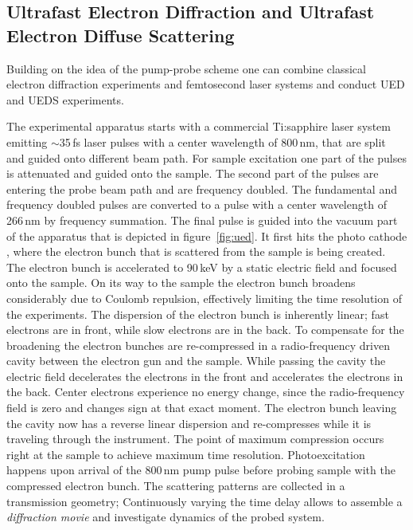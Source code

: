 \subsection{Ultrafast Electron Diffraction and Ultrafast Electron Diffuse Scattering}
Building on the idea of the pump-probe scheme one can combine classical electron diffraction experiments and femtosecond laser systems and conduct \ac{UED} and \ac{UEDS} experiments.

The experimental apparatus starts with a commercial Ti:sapphire laser system emitting $\sim$35\,fs laser pulses with a center wavelength of 800\,nm, that are split and guided onto different beam path.
For sample excitation one part of the pulses is attenuated and guided onto the sample.
The second part of the pulses are entering the probe beam path and are frequency doubled. The fundamental and frequency doubled pulses are converted to a pulse with a center wavelength of 266\,nm by frequency summation.
The final pulse is guided into the vacuum part of the apparatus that is depicted in figure~\ref{fig:ued}.
It first hits the photo cathode , where the electron bunch that is scattered from the sample is being created.
The electron bunch is accelerated to 90\,keV by a static electric field and focused onto the sample.
On its way to the sample the electron bunch broadens considerably due to Coulomb repulsion, effectively limiting the time resolution of the experiments.
The dispersion of the electron bunch is inherently linear; fast electrons are in front, while slow electrons are in the back.
To compensate for the broadening the electron bunches are re-compressed in a radio-frequency driven cavity between the electron gun and the sample.
While passing the cavity the electric field decelerates the electrons in the front and accelerates the electrons in the back.
Center electrons experience no energy change, since the radio-frequency field is zero and changes sign at that exact moment.
The electron bunch leaving the cavity now has a reverse linear dispersion and re-compresses while it is traveling through the instrument.
The point of maximum compression occurs right at the sample to achieve maximum time resolution.
Photoexcitation happens upon arrival of the 800\,nm pump pulse before probing sample with the compressed electron bunch.
The scattering patterns are collected in a transmission geometry; Continuously varying the time delay allows to assemble a \emph{diffraction movie} and investigate dynamics of the probed system.

